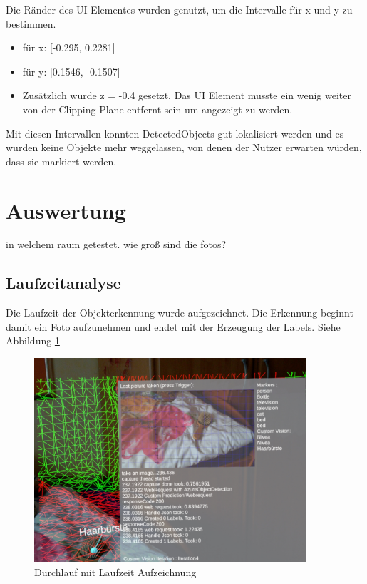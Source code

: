 Die Ränder des UI Elementes wurden genutzt, um die Intervalle für x und y zu bestimmen.
\begin{itemize}
	\item für x: [-0.295, 0.2281]
	\item für y: [0.1546, -0.1507]
	\item Zusätzlich wurde z = -0.4 gesetzt. Das UI Element musste ein wenig weiter von der Clipping Plane entfernt sein um angezeigt zu werden.
\end{itemize}

Mit diesen Intervallen konnten DetectedObjects gut lokalisiert werden und es wurden keine Objekte mehr weggelassen, von denen der Nutzer erwarten würden, dass sie markiert werden.

\newpage
\section{Auswertung}
in welchem raum getestet. wie groß sind die fotos?

\subsection{Laufzeitanalyse}

Die Laufzeit der Objekterkennung wurde aufgezeichnet. Die Erkennung beginnt damit ein Foto aufzunehmen und endet mit der Erzeugung der Labels. Siehe Abbildung \ref{img:laufzeit}

\begin{figure}[H]
	\centering
	\includegraphics[width=0.9\textwidth]{images/ML_20201005_16.12.36.jpg}
	\caption[]{Durchlauf mit Laufzeit Aufzeichnung}
	\label{img:laufzeit}
\end{figure}

